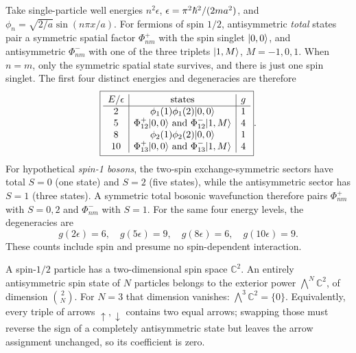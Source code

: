 Take single-particle well energies $n^2\epsilon$,
$\epsilon=\pi^2\hbar^2/(2ma^2)$, and
$\phi_n=\sqrt{2/a}\sin(n\pi x/a)$.
For fermions of spin $1/2$, antisymmetric
\emph{total} states pair a symmetric
spatial factor $\Phi^+_{nm}$ with the
spin singlet $\lvert0,0\rangle$, and antisymmetric
$\Phi^-_{nm}$ with one of the three triplets
$\lvert1,M\rangle$, $M=-1,0,1$.
When $n=m$, only the symmetric spatial
state survives, and there is just one
spin singlet. The first four distinct
energies and degeneracies are therefore
\begin{equation}
\boxed{
\begin{array}{c|c|c}
E/\epsilon&\text{states}&g\\\hline
2&\phi_1(1)\phi_1(2)\lvert0,0\rangle&1\\
5&\Phi^+_{12}\lvert0,0\rangle\text{ and }
\Phi^-_{12}\lvert1,M\rangle&4\\
8&\phi_2(1)\phi_2(2)\lvert0,0\rangle&1\\
10&\Phi^+_{13}\lvert0,0\rangle\text{ and }
\Phi^-_{13}\lvert1,M\rangle&4
\end{array}}.
\end{equation}
For hypothetical \emph{spin-1 bosons},
the two-spin exchange-symmetric sectors
have total $S=0$ (one state) and $S=2$
(five states), while the antisymmetric
sector has $S=1$ (three states).
A symmetric total bosonic wavefunction
therefore pairs $\Phi^+_{nm}$ with $S=0,2$
and $\Phi^-_{nm}$ with $S=1$.
For the same four energy levels, the
degeneracies are
\begin{equation}
\boxed{g(2\epsilon)=6,\quad
g(5\epsilon)=9,\quad
g(8\epsilon)=6,\quad
g(10\epsilon)=9}.
\end{equation}
These counts include spin and presume no
spin-dependent interaction.

A spin-$1/2$ particle has a two-dimensional
spin space $\mathbb C^2$. An entirely
antisymmetric spin state of $N$ particles
belongs to the exterior power
$\bigwedge^N\mathbb C^2$, of dimension
$\binom{2}{N}$. For $N=3$ that dimension
vanishes: $\boxed{\bigwedge^3\mathbb C^2=\{0\}}$.
Equivalently, every triple of arrows
$\uparrow,\downarrow$ contains two equal
arrows; swapping those must reverse the
sign of a completely antisymmetric state
but leaves the arrow assignment unchanged,
so its coefficient is zero.

